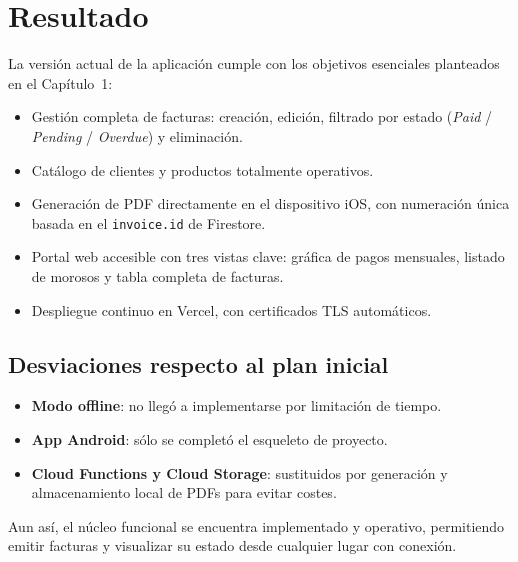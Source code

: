 
\section{Resultado}

\begin{large}

La versión actual de la aplicación cumple con los objetivos esenciales planteados en el Capítulo~1:
\begin{itemize}
    \item Gestión completa de facturas: creación, edición, filtrado por estado (\textit{Paid} / \textit{Pending} / \textit{Overdue}) y eliminación.
    \item Catálogo de clientes y productos totalmente operativos.
    \item Generación de PDF directamente en el dispositivo iOS, con numeración única basada en el \texttt{invoice.id} de Firestore.
    \item Portal web accesible con tres vistas clave: gráfica de pagos mensuales, listado de morosos y tabla completa de facturas.
    \item Despliegue continuo en Vercel, con certificados TLS automáticos.
\end{itemize}

\end{large}

\subsection{Desviaciones respecto al plan inicial}

\begin{large}

\begin{itemize}
    \item \textbf{Modo offline}: no llegó a implementarse por limitación de tiempo.
    \item \textbf{App Android}: sólo se completó el esqueleto de proyecto.
    \item \textbf{Cloud Functions y Cloud Storage}: sustituidos por generación y almacenamiento local de PDFs para evitar costes.
\end{itemize}

Aun así, el núcleo funcional se encuentra implementado y operativo, permitiendo emitir facturas y visualizar su estado desde cualquier lugar con conexión.

\end{large}

